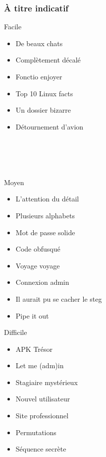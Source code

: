 \documentclass{beamer}
\begin{document}

\begin{frame}
\frametitle{À titre indicatif}
\fontsize{9}{12}\selectfont
\begin{multicols}{3}
    Facile
    \begin{itemize}
        \item De beaux chats
        \item Complètement décalé
        \item Fonctio enjoyer
        \item Top 10 Linux facts
        \item Un dossier bizarre
        \item Détournement d'avion
    \end{itemize}
    
    
    \\~\\
    \\~\\

    Moyen
    \begin{itemize}
        \item L'attention du détail
        \item Plusieurs alphabets
        \item Mot de passe solide
        \item Code obfusqué
        \item Voyage voyage
        \item Connexion admin
        \item Il aurait pu se cacher le steg
        \item Pipe it out
    \end{itemize}
    
    Difficile
    \begin{itemize}
        \item APK Trésor
        \item Let me (adm)in
        \item Stagiaire mystérieux
        \item Nouvel utilisateur
        \item Site professionnel
        \item Permutations
        \item Séquence secrète
    \end{itemize}
    \hspace{10}


\end{multicols}

\end{frame}
\end{document}
